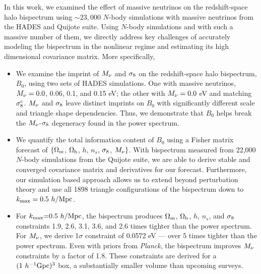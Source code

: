 In this work, we examined the effect of massive neutrinos on the redshift-space 
halo bispectrum using ${\sim}23,000$ $N$-body simulations with massive neutrinos
from the HADES and Quijote suite. Using $N$-body simulations and with such a massive 
number of them, we directly address key challenges of accurately modeling the 
bispectrum in the nonlinear regime and estimating its high dimensional covariance 
matrix. More specifically, 
\begin{itemize}
    \item We examine the imprint of $M_\nu$ and $\sigma_8$ on the redshift-space halo bispectrum, 
        $B_0$, using two sets of HADES simulations. One with massive neutrinos, $M_\nu = 0.0$, 0.06, 
        0.1, and 0.15 eV; the other with $M_\nu = 0.0$ eV and matching $\sigma_8^{c}$. 
        $M_\nu$ and $\sigma_8$ leave distinct imprints on $B_0$ with significantly different 
        scale and triangle shape dependencies. Thus, we demonstrate that $B_0$ helps 
        break the $M_\nu$-$\sigma_8$ degeneracy found in the power spectrum. 
    \item We quantify the total information content of $B_0$ using a Fisher matrix forecast of 
        $\{\Omega_{\rm m}$, $\Omega_{\rm b}$, $h$, $n_s$, $\sigma_8$, $M_\nu\}$. With bispectrum measured from 22,000 
        $N$-body simulations from the Quijote suite, we are able to derive stable and converged 
        covariance matrix and derivatives for our forecast. Furthermore, our simulation 
        based approach allows us to extend beyond perturbation theory and use all 1898 
        triangle configurations of the bispectrum down to $k_{\rm max} = 0.5~h/{\rm Mpc}$.
    \item For $k_{\rm max}{=}0.5~h/{\rm Mpc}$, the bispectrum produces $\Omega_{\rm m}$, $\Omega_{\rm b}$, $h$, $n_s$, and 
        $\sigma_8$ constraints 1.9, 2.6, 3.1, 3.6, and 2.6 times tighter than the power spectrum. 
        For $M_\nu$, we derive 1$\sigma$ constraint of 0.0572 eV --- over 5 times tighter than 
        the power spectrum. Even with priors from {\em Planck}, the bispectrum improves 
        $M_\nu$ constraints by a factor of 1.8. These constraints are derived for a 
        $(1~h^{-1}{\rm Gpc})^3$ box, a substantially smaller volume than upcoming surveys.
\end{itemize}

